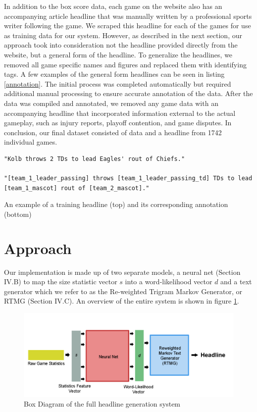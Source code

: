 \documentclass[12pt, journal]{IEEEtran}
\begin{document}
In addition to the box score data, each game on the website also has an accompanying article headline that was manually written by a professional sports writer following the game. We scraped this headline for each of the games for use as training data for our system. However, as described in the next section, our approach took into consideration not the headline provided directly from the website, but a general form of the headline. To generalize the headlines, we removed all game specific names and figures and replaced them with identifying tags. A few examples of the general form headlines can be seen in listing \ref{annotation}. The initial process was completed automatically but required additional manual processing to ensure accurate annotation of the data. After the data was compiled and annotated, we removed any game data with an accompanying headline that incorporated information external to the actual gameplay, such as injury reports, playoff contention, and game disputes. In conclusion, our final dataset consisted of data and a headline from 1742 individual games.


\begin{listing}[H]
\begin{verbatim}
"Kolb throws 2 TDs to lead Eagles' rout of Chiefs."

"[team_1_leader_passing] throws [team_1_leader_passing_td] TDs to lead [team_1_mascot] rout of [team_2_mascot]."
\end{verbatim}
\caption{An example of a training headline (top) and its corresponding annotation (bottom)}
\label{annotation}
\end{listing}


\section{Approach}

Our implementation is made up of two separate models, a neural net (Section IV.B) to map the size statistic vector $s$ into a word-likelihood vector $d$ and a text generator which we refer to as the Re-weighted Trigram Markov Generator, or RTMG (Section IV.C). An overview of the entire system is shown in figure \ref{model_graph}. 

\begin{figure}[t]
\centering
\includegraphics[width=7in]{model_graph.png}
\caption{Box Diagram of the full headline generation system}
\label{model_graph}
\end{figure}
\end{document}
